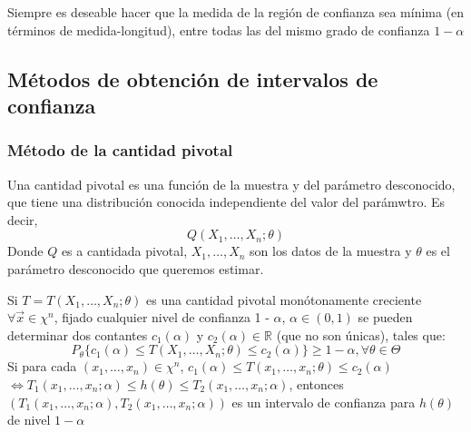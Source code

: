 \begin{observación}
Siempre es deseable hacer que la medida de la región de confianza sea mínima (en términos de medida-longitud), entre todas las del mismo grado de confianza $1-\alpha$
\end{observación}


\subsection{Métodos de obtención de intervalos de confianza}
\subsubsection{Método de la cantidad pivotal}
\begin{definición}
    Una cantidad pivotal es una función de la muestra y del parámetro desconocido, que tiene una distribución conocida independiente del valor del parámwtro. Es decir, 
    $$Q(X_1, \ldots, X_n; \theta)$$ 
    Donde $Q$ es a cantidada pivotal, $X_1, \ldots, X_n$ son los datos de la muestra y $\theta$ es el parámetro desconocido que queremos estimar.
\end{definición}

\begin{teorema}
    Si $T = T(X_1, \ldots, X_n; \theta)$ es una cantidad pivotal monótonamente creciente $\forall \vec{x} \in \chi^n$, fijado cualquier nivel de confianza 1 - $\alpha$, $\alpha \in (0,1)$ se pueden determinar dos contantes $c_1(\alpha)$ y $c_2(\alpha) \in \mathbb{R}$ (que no son únicas), tales que:
    $$P_\theta\{c_1(\alpha) \leq T(X_1, \ldots, X_n; \theta) \leq c_2(\alpha)\} \geq 1 - \alpha, \forall \theta \in \Theta$$
    Si para cada $\left(x_1, \ldots, x_n\right) \in \chi^n$, $c_1(\alpha) \leq T(x_1, \ldots, x_n; \theta) \leq c_2(\alpha)$ $\Leftrightarrow T_1(x_1, \ldots, x_n; \alpha) \leq h(\theta) \leq T_2(x_1, \ldots, x_n; \alpha)$, entonces $\left(T_1(x_1, \ldots, x_n; \alpha), T_2(x_1, \ldots, x_n; \alpha)\right)$ es un intervalo de confianza para $h(\theta)$ de nivel $1 - \alpha$
\end{teorema}


